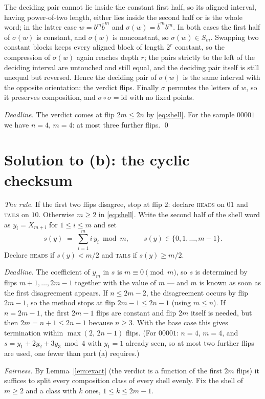 \documentclass[11pt]{article}
\theoremstyle{remark}
\newcommand{\head}{\textnormal{\textsc{heads}}}
\newcommand{\tail}{\textnormal{\textsc{tails}}}
\begin{document}
The deciding pair cannot lie inside the constant first half, so its aligned
interval, having power-of-two length, either lies inside the second half or
is the whole word; in the latter case $w=b^m\bar b^m$ and
$\sigma(w)=\bar b^m b^m$. In both cases the first half of $\sigma(w)$ is
constant, and $\sigma(w)$ is nonconstant, so $\sigma(w)\in S_m$. Swapping two
constant blocks keeps every aligned block of length $2^r$ constant, so the
compression of $\sigma(w)$ again reaches depth $r$; the pairs strictly to the
left of the deciding interval are untouched and still equal, and the deciding
pair itself is still unequal but reversed. Hence the deciding pair of
$\sigma(w)$ is the same interval with the opposite orientation: the verdict
flips. Finally $\sigma$ permutes the letters of $w$, so it preserves
composition, and $\sigma\circ\sigma=\mathrm{id}$ with no fixed points.

\emph{Deadline.} The verdict comes at flip $2m\le 2n$ by \eqref{eq:shell}.
For the sample $00001$ we have $n=4$, $m=4$: at most three further flips.
\qed

\section*{Solution to (b): the cyclic checksum}

\emph{The rule.} If the first two flips disagree, stop at flip $2$: declare
\head{} on $01$ and \tail{} on $10$. Otherwise $m\ge 2$ in
\eqref{eq:shell}. Write the second half of the shell word as
$y_i=X_{m+i}$ for $1\le i\le m$ and set
\[
s(y)\;=\;\sum_{i=1}^{m} i\,y_i \bmod m,\qquad s(y)\in\{0,1,\dots,m-1\}.
\]
Declare \head{} if $s(y)<m/2$ and \tail{} if $s(y)\ge m/2$.

\emph{Deadline.} The coefficient of $y_m$ in $s$ is $m\equiv 0\pmod m$, so
$s$ is determined by flips $m+1,\dots,2m-1$ together with the value of $m$
--- and $m$ is known as soon as the first disagreement appears. If
$n\le 2m-2$, the disagreement occurs by flip $2m-1$, so the method stops at
flip $2m-1\le 2n-1$ (using $m\le n$). If $n=2m-1$, the first $2m-1$ flips
are constant and flip $2m$ itself is needed, but then
$2m=n+1\le 2n-1$ because $n\ge 3$. With the base case this gives
termination within $\max(2,\,2n-1)$ flips. (For $00001$: $n=4$, $m=4$, and
$s=y_1+2y_2+3y_3 \bmod 4$ with $y_1=1$ already seen, so at most two further
flips are used, one fewer than part (a) requires.)

\emph{Fairness.} By Lemma~\ref{lem:exact} (the verdict is a function of the
first $2m$ flips) it suffices to split every composition class of every shell
evenly. Fix the shell of $m\ge 2$ and a class with $k$ ones, $1\le k\le
2m-1$.
\end{document}
